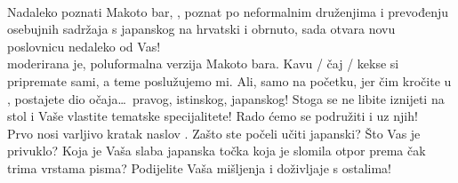 \documentclass[ocha]{grampig}
\begin{document}
	\begin{minipage}{\width}
		\onehalfspacing
		{\Large {}} \\[-0.5em]
		
		Nadaleko poznati Makoto bar, , poznat po neformalnim druženjima i prevođenju osebujnih sadržaja s japanskog na hrvatski i obrnuto, sada otvara novu poslovnicu nedaleko od Vas! \\[-1em]
		
		 moderirana je, poluformalna verzija Makoto bara.
		Kavu / čaj / kekse si pripremate sami, a te\-me po\-slu\-žu\-je\-mo mi.
		Ali, samo na početku, jer čim kročite u , postajete dio očaja\ldots\ pravog, istinskog, japanskog!
		Stoga se ne libite iznijeti na stol i Vaše vlastite tematske specijalitete!
		Rado ćemo se podružiti i uz njih! \\[-1em]
		
		Prvo  nosi varljivo kratak naslov . 
		Zašto ste počeli učiti japanski?
		Što Vas je privuklo? Koja je Vaša slaba japanska točka koja je slomila otpor prema čak trima vrstama pisma?
		Podijelite Vaša mišljenja i doživljaje s ostalima! \\[-2em]
		
		\begin{center}
		\end{center}
	\end{minipage}
\end{document}
